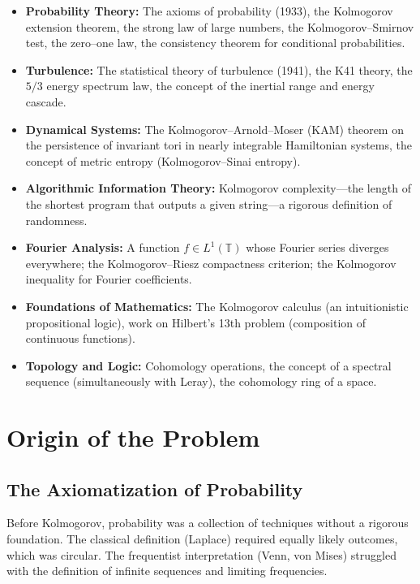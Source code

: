 \begin{itemize}
    \item \textbf{Probability Theory:} The axioms of probability (1933), the Kolmogorov extension theorem, the strong law of large numbers, the Kolmogorov--Smirnov test, the zero--one law, the consistency theorem for conditional probabilities.
    \item \textbf{Turbulence:} The statistical theory of turbulence (1941), the K41 theory, the $5/3$ energy spectrum law, the concept of the inertial range and energy cascade.
    \item \textbf{Dynamical Systems:} The Kolmogorov--Arnold--Moser (KAM) theorem on the persistence of invariant tori in nearly integrable Hamiltonian systems, the concept of metric entropy (Kolmogorov--Sinai entropy).
    \item \textbf{Algorithmic Information Theory:} Kolmogorov complexity---the length of the shortest program that outputs a given string---a rigorous definition of randomness.
    \item \textbf{Fourier Analysis:} A function $f \in L^1(\mathbb{T})$ whose Fourier series diverges everywhere; the Kolmogorov--Riesz compactness criterion; the Kolmogorov inequality for Fourier coefficients.
    \item \textbf{Foundations of Mathematics:} The Kolmogorov calculus (an intuitionistic propositional logic), work on Hilbert's 13th problem (composition of continuous functions).
    \item \textbf{Topology and Logic:} Cohomology operations, the concept of a spectral sequence (simultaneously with Leray), the cohomology ring of a space.
\end{itemize}

\section{Origin of the Problem}

\subsection{The Axiomatization of Probability}

Before Kolmogorov, probability was a collection of techniques without a rigorous foundation. The classical definition (Laplace) required equally likely outcomes, which was circular. The frequentist interpretation (Venn, von Mises) struggled with the definition of infinite sequences and limiting frequencies.

